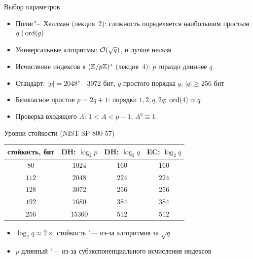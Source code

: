 \documentclass{ca-slides}
\begin{document}
\begin{canvasframe}{Выбор параметров}
  \begin{itemize}
    \item Полиг"--~Хеллман (лекция~2): сложность определяется наибольшим простым $q \mid \operatorname{ord}(g)$
    \item Универсальные алгоритмы: $\mathcal{O}(\sqrt q)$, и лучше нельзя
    \item Исчисление индексов в $(\mathbb{Z}/p\mathbb{Z})^{*}$ (лекция~4): $p$ гораздо длиннее $q$
    \item Стандарт: $|p| = 2048$"--~$3072$ бит, $g$ простого порядка $q$, $|q| \ge 256$ бит
    \item Безопасное простое $p = 2q + 1$: порядки $1, 2, q, 2q$; $\operatorname{ord}(4) = q$
    \item Проверка входящего $A$: $1 < A < p - 1$, $A^q \equiv 1$
  \end{itemize}
  \penspace[0.12\textheight]
\end{canvasframe}

\begin{canvasframe}{Уровни стойкости (NIST SP 800-57)}
  \centering
  \begin{tabular}{c|c|c|c}
    стойкость, бит & DH: $\log_2 p$ & DH: $\log_2 q$ & EC: $\log_2 q$ \\ \hline
    $80$  & $1024$  & $160$ & $160$ \\
    $112$ & $2048$  & $224$ & $224$ \\
    $128$ & $3072$  & $256$ & $256$ \\
    $192$ & $7680$  & $384$ & $384$ \\
    $256$ & $15360$ & $512$ & $512$
  \end{tabular}
  \par\medskip\raggedright
  \begin{itemize}
    \item $\log_2 q \approx 2 \times$ стойкость "--- из-за алгоритмов за $\sqrt q$
    \item $p$ длинный "--- из-за субэкспоненциального исчисления индексов
  \end{itemize}
\end{canvasframe}
\end{document}
